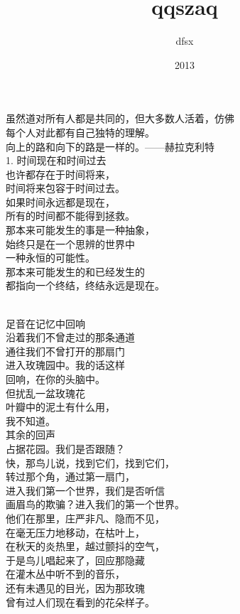 \documentclass{article}
\title{qqszaq}
\author{dfsx}
\date{2013}
\begin{document}

\maketitle

\setlength\parindent{0pt}


\Large

﻿虽然道对所有人都是共同的，但大多数人活着，仿佛\\
每个人对此都有自己独特的理解。\\
向上的路和向下的路是一样的。——赫拉克利特
\\
1. 时间现在和时间过去\\
也许都存在于时间将来，\\
时间将来包容于时间过去。\\
如果时间永远都是现在，\\
所有的时间都不能得到拯救。\\
那本来可能发生的事是一种抽象，\\
始终只是在一个思辨的世界中\\
一种永恒的可能性。\\
那本来可能发生的和已经发生的\\
都指向一个终结，终结永远是现在。

\newpage 


\\
足音在记忆中回响\\
沿着我们不曾走过的那条通道\\
通往我们不曾打开的那扇门\\
进入玫瑰园中。我的话这样\\
回响，在你的头脑中。\\
但扰乱一盆玫瑰花\\
叶瓣中的泥土有什么用，\\
我不知道。\\
其余的回声\\
占据花园。我们是否跟随？\\
快，那鸟儿说，找到它们，找到它们，\\
转过那个角，通过第一扇门，\\
进入我们第一个世界，我们是否听信\\
画眉鸟的欺骗？进入我们的第一个世界。\\
他们在那里，庄严非凡、隐而不见，\\
在毫无压力地移动，在枯叶上，\\
在秋天的炎热里，越过颤抖的空气，\\
于是鸟儿唱起来了，回应那隐藏\\
在灌木丛中听不到的音乐，\\
还有未遇见的目光，因为那玫瑰\\
曾有过人们现在看到的花朵样子。
\end{document}
